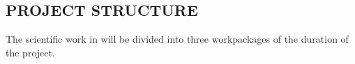 






\subsection*{PROJECT STRUCTURE}


The scientific work in \project will be divided into three workpackages of the duration of the  project.

